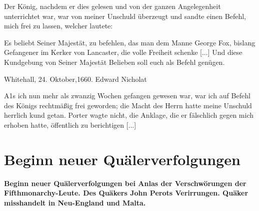 Der König, nachdem er dies gelesen und von der ganzen
Angelegenheit unterrichtet war, war von meiner Unschuld überzeugt 
und sandte einen Befehl, mich frei zu lassen, welcher lautete:

\glqq Es beliebt Seiner Majestät, zu befehlen, das man dem Manne
George Fox, bislang Gefangener im Kerker von Lancaster, die
volle Freiheit schenke [...] Und diese Kundgebung von Seiner
Majestät Belieben soll euch als Befehl genügen.\grqq

\begin{flushright}Whitehall, 24. Oktober,1660. Edward Nicholat\end{flushright}

A1s ich nun mehr als zwanzig Wochen gefangen gewesen
war, war ich auf Befehl des Königs rechtmäßig frei geworden;
die Macht des Herrn hatte meine Unschuld herrlich kund getan.
Porter wagte nicht, die Anklage, die er fälschlich gegen mich
erhoben hatte, öffentlich zu berichtigen [...]

\chapter[Beginn neuer Quälerverfolgungen]{Beginn neuer Quälerverfolgungen}

\begin{center}
\textbf{Beginn neuer Quälerverfolgungen bei Anlas der Verschwörungen
der Fifthmonarchy-Leute. Des Quäkers John Perots Verirrungen.
Quäker misshandelt in Neu-England und Malta.}
\end{center}

